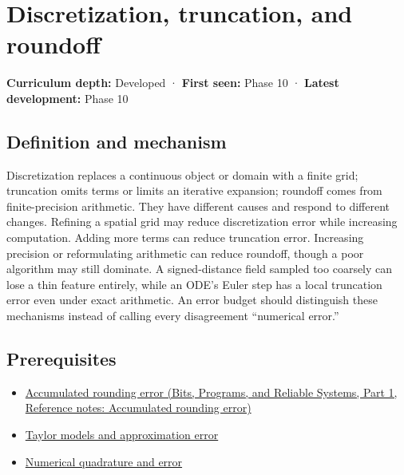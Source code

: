 \hypertarget{appendix-6b0648b2b8e8}{}\label{referencestart:appendix-6b0648b2b8e8}
\section{Discretization, truncation, and roundoff}\label{appendix-6b0648b2b8e8-discretization-truncation-and-roundoff}

\hypertarget{appendix-6b0648b2b8e8-discretization-truncation-and-roundoff}{}

\textbf{Curriculum depth:} Developed · \textbf{First seen:} Phase 10 · \textbf{Latest development:} Phase 10

\begin{allmightroledefinition}

\subsection{Definition and mechanism}\label{appendix-6b0648b2b8e8-definition-and-mechanism}

\hypertarget{appendix-6b0648b2b8e8-definition-and-mechanism}{}

Discretization replaces a continuous object or domain with a finite grid; truncation omits terms or limits an iterative expansion; roundoff comes from finite-precision arithmetic. They have different causes and respond to different changes. Refining a spatial grid may reduce discretization error while increasing computation. Adding more terms can reduce truncation error. Increasing precision or reformulating arithmetic can reduce roundoff, though a poor algorithm may still dominate. A signed-distance field sampled too coarsely can lose a thin feature entirely, while an ODE's Euler step has a local truncation error even under exact arithmetic. An error budget should distinguish these mechanisms instead of calling every disagreement ``numerical error.''

\end{allmightroledefinition}

\subsection{Prerequisites}\label{appendix-6b0648b2b8e8-prerequisites}

\hypertarget{appendix-6b0648b2b8e8-prerequisites}{}

\begin{itemize}
\tightlist
\item
  \href{../01-Bits-Programs-and-Reliable-Systems-P01/main.pdf\#appendix-f82e270791c8}{Accumulated rounding error (Bits, Programs, and Reliable Systems, Part 1, Reference notes: Accumulated rounding error)}
\item
  \hyperref[appendix-32f39e9a3738]{Taylor models and approximation error}
\item
  \hyperref[appendix-80521eae6b71]{Numerical quadrature and error}
\end{itemize}

